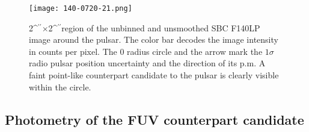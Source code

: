 \documentclass[pdftex,twocolumn]{aastex62}
\def\asec{\ifmmode ^{\prime\prime}\else$^{\prime\prime}$\fi}
\newcommand{\gp}[1]{{\color{blue} #1}}
\begin{document}
\begin{figure}[b!]
\texttt{[image: 140-0720-21.png]}
\caption{2\asec$\times$2\asec region of the 
unbinned and unsmoothed
SBC F140LP image 
around the pulsar. 
The color bar decodes the image intensity in counts per pixel.
The 0 radius circle and the arrow mark the 
$1 \sigma$ radio pulsar position uncertainty 
and the direction of its p.m. A faint point-like 
counterpart candidate to the pulsar is clearly visible within the circle.
\label{fig:4}}
\end{figure}


\subsection{Photometry of the FUV counterpart candidate}
\end{document}
